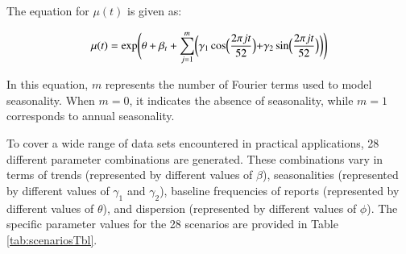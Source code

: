 \documentclass[preprint, 3p, authoryear]{elsarticle} %
\begin{document}
The equation for \(\mu(t)\) is given as:

\begin{equation}
  \mu(t)=\exp\Biggl(\theta+\beta_t+\sum_{j=1}^m \biggl(\gamma_1 \cos\Bigl(\frac{2\pi jt}{52}\Bigl) + \gamma_2 \sin \Bigl(\frac{2\pi jt}{52} \Bigl)\biggl)\Biggl)
\end{equation}

In this equation, \(m\) represents the number of Fourier terms used to model seasonality. When \(m=0\), it indicates the absence of seasonality, while \(m=1\) corresponds to annual seasonality.

To cover a wide range of data sets encountered in practical applications, 28 different parameter combinations are generated. These combinations vary in terms of trends (represented by different values of \(\beta\)), seasonalities (represented by different values of \(\gamma_1\) and \(\gamma_2\)), baseline frequencies of reports (represented by different values of \(\theta\)), and dispersion (represented by different values of \(\phi\)). The specific parameter values for the 28 scenarios are provided in Table \ref{tab:scenariosTbl}.
\end{document}

